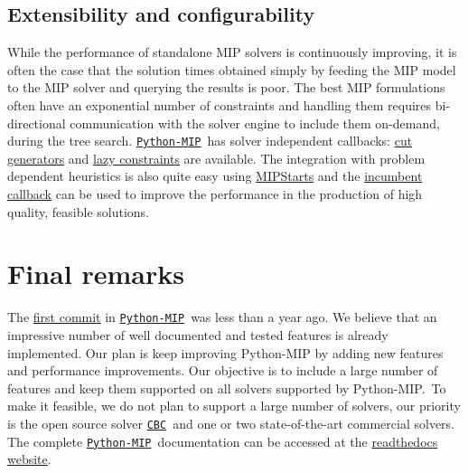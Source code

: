 \documentclass{article}
\def\CBC{\href{https://github.com/coin-or/cbc}{\texttt{CBC}}}
\def\PythonMIP{\href{https://github.com/coin-or/python-mip}{\texttt{Python-MIP}}}
\begin{document}
\subsection{Extensibility and configurability}

While the performance of standalone MIP solvers is continuously improving, it is often the case that the solution times obtained simply by feeding the MIP model to the MIP solver and querying the results is poor. The best MIP formulations often have an exponential number of constraints and handling them requires bi-directional communication with the solver engine to include them on-demand, during the tree search. \PythonMIP\ has solver independent callbacks: \href{https://python-mip.readthedocs.io/en/latest/custom.html#cut-callback}{cut generators} and \href{https://python-mip.readthedocs.io/en/latest/custom.html#lazy-constraints}{lazy constraints} are available. The integration with problem dependent heuristics is also quite easy using \href{https://python-mip.readthedocs.io/en/latest/custom.html#providing-initial-feasible-solutions}{MIPStarts} and the \href{https://python-mip.readthedocs.io/en/latest/classes.html#incumbentupdater}{incumbent callback} can be used to improve the performance in the production of high quality, feasible solutions.

\section{Final remarks}

The \href{https://github.com/coin-or/python-mip/commit/ba1719db4bf033dd661844bc797779a98a884d81}{first commit} in \PythonMIP\ was less than a year ago. We believe that an impressive number of well documented and tested features is already implemented. Our plan is keep improving Python-MIP by adding new features and performance improvements. Our objective is to include a large number of features and keep them supported on all solvers supported by Python-MIP.\ To make it feasible, we do not plan to support a large number of solvers, our priority is the open source solver \CBC\ and one or two state-of-the-art commercial solvers. The complete \PythonMIP\ documentation can be accessed at the \href{https://python-mip.readthedocs.io}{readthedocs website}.



\end{document}
